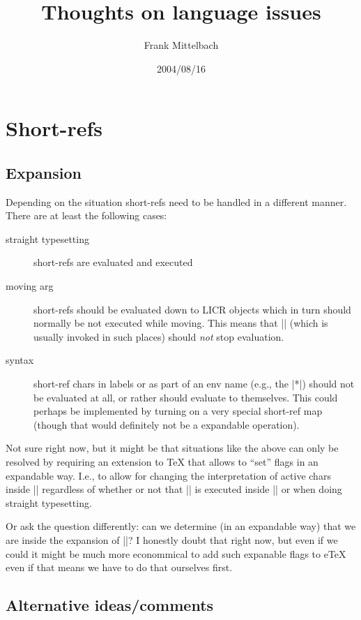 \documentclass{ltxdoc}
\title{Thoughts on language issues}
\author{Frank Mittelbach}
\date{2004/08/16}
\begin{document}
\maketitle
\tableofcontents

\section{Short-refs}
\subsection{Expansion}

Depending on the situation short-refs need to be handled in a
different manner. There are at least the following cases:
\begin{description}
\item[straight typesetting]
  short-refs are evaluated and executed
\item[moving arg]
  short-refs should be evaluated down to LICR objects which in turn
  should normally be not executed while moving. This means that
  |\protected@edef| (which is usually invoked in such places) should
  \emph{not} stop evaluation. 
\item[syntax]
  short-ref chars in labels or as part of an env name (e.g., the |*|)
  should not be evaluated at all, or rather should evaluate to
  themselves. This could perhaps be implemented by turning on a very
  special short-ref map (though that would definitely not be a
  expandable operation).
\end{description}

Not sure right now, but it might be that situations like the above can
only be resolved by requiring an extension to \TeX{} that allows to
``set'' flags in an expandable way. I.e., to allow for changing the
interpretation of active chars inside |\csname| regardless of whether
or not that |\csname| is executed inside |\protected@edef| or when
doing straight typesetting.

Or ask the question differently: can we determine (in an expandable
way) that we are inside the expansion of |\csname|? I honestly doubt
that right now, but even if we could it might be much more econommical
to add such expanable flags to e\TeX{} even if that means we have to
do that ourselves first.


\subsection{Alternative ideas/comments}
\end{document}
